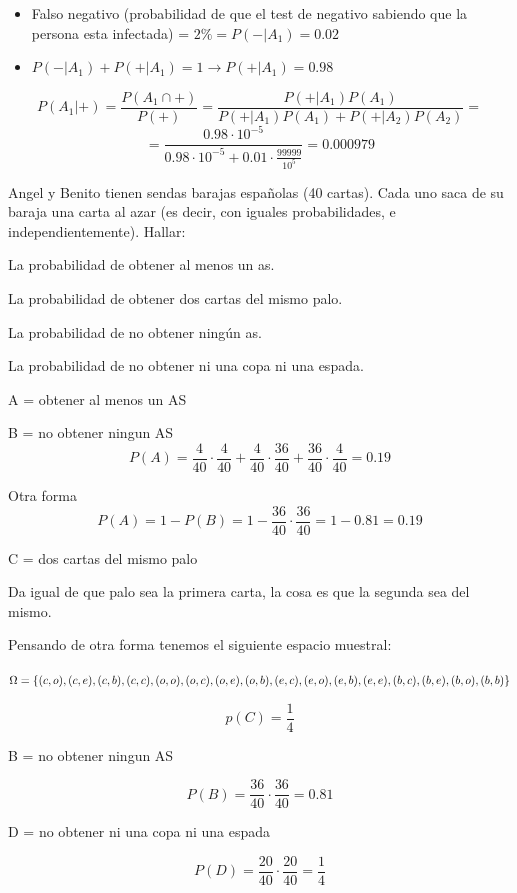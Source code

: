 \begin{problem}[3]
\begin{expla}
\begin{itemize}
\item Falso negativo (probabilidad de que el test de negativo sabiendo que la persona esta infectada) = $2\% = P(-|A_1)=0.02$

\item $P(-|A_1)+P(+|A_1)=1 \rightarrow P(+|A_1)=0.98$
\end{itemize}

\end{expla}



\[
P(A_1|+)=\frac{P(A_1\cap +)}{P(+)}=\frac{P(+|A_1)P(A_1)}{P(+|A_1)P(A_1)+P(+|A_2)P(A_2)}=
\]
\[
=\frac{0.98\cdot10^{-5}}{0.98\cdot10^{-5}+0.01\cdot\frac{99999}{10^5}}=0.000979
\]

\end{problem}


\begin{problem}[4]Angel y Benito tienen sendas barajas espa\~nolas (40 cartas). Cada uno saca de su
baraja una carta al azar (es decir, con iguales probabilidades, e independientemente). Hallar:

\ppart La probabilidad de obtener al menos un as. 

\ppart La probabilidad de obtener dos cartas del mismo palo. 

\ppart La probabilidad de no obtener ning\'un as.

\ppart La probabilidad de no obtener ni una copa ni una espada.
\solution

\begin{expla}

\end{expla}

\spart
A = obtener al menos un AS

B = no obtener ningun AS
\[
P(A)=\frac{4}{40}\cdot\frac{4}{40}+\frac{4}{40}\cdot\frac{36}{40}+\frac{36}{40}\cdot\frac{4}{40} = 0.19
\]

Otra forma
\[
P(A)=1-P(B)=1-\frac{36}{40}\cdot\frac{36}{40} = 1 - 0.81 = 0.19
\]

\spart
C = dos cartas del mismo palo

Da igual de que palo sea la primera carta, la cosa es que la segunda sea del mismo.

Pensando de otra forma tenemos el siguiente espacio muestral:

$\Omega = \{(c, o),(c, e),(c, b),(c, c),(o, o),(o, c),(o, e),(o, b),(e, c),(e, o),(e, b),(e, e),(b, c),(b, e)\\,(b, o),(b, b)\}$

\[
p(C)=\frac{1}{4}
\]

\spart
B = no obtener ningun AS

\[
P(B)=\frac{36}{40}\cdot\frac{36}{40} = 0.81
\]

\spart
D = no obtener ni una copa ni una espada

\[
P(D) = \frac{20}{40}\cdot\frac{20}{40}=\frac{1}{4}
\]


\end{problem}


